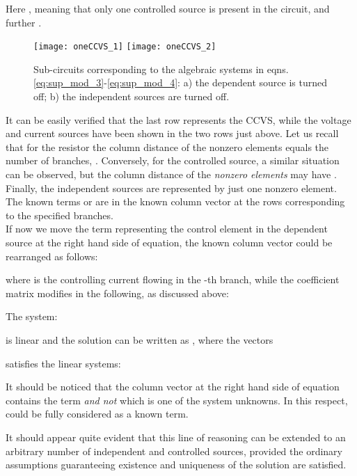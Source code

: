 \documentclass[10pt]{amsart}
\begin{document}
Here , meaning that only one controlled source is present in the circuit, and further .
\begin{figure}[h]
\centering
\texttt{[image: oneCCVS\_1]}
\texttt{[image: oneCCVS\_2]}
\caption{Sub-circuits corresponding to the algebraic systems in eqns. \eqref{eq:sup_mod_3}-\eqref{eq:sup_mod_4}: a)  the dependent source is turned off; b) the independent sources are turned off.}
\label{fig:CS1_ex_2}
\end{figure}


It can be easily verified that the last row represents the CCVS, while the voltage and current sources have been shown in the two rows just above. Let us recall that for the resistor the column distance of the nonzero elements equals the number of branches, . Conversely, for the controlled source, a similar situation can be observed, but the column distance of the \emph{nonzero elements} may have . 
Finally, the independent sources are represented by just one nonzero element. The known terms  or  are in the known column vector at the rows corresponding to the specified branches.\\

If now we move the term representing the control element in the dependent source at the right hand side of equation, the known column vector could be rearranged as follows:

where  is the controlling current flowing in the -th branch, while the coefficient matrix modifies in the following, as discussed above:





The system:



is linear and the solution can be written as , where the vectors



satisfies the linear systems:



It should be noticed that the column vector  at the right hand side of equation contains the term  \emph{and not}  which is one of the system unknowns. In this respect,  could be fully considered as a known term.



It should appear quite evident that this line of reasoning can be extended to an arbitrary number of independent and controlled sources, provided the ordinary assumptions guaranteeing existence and uniqueness of the solution are satisfied.
\end{document}
